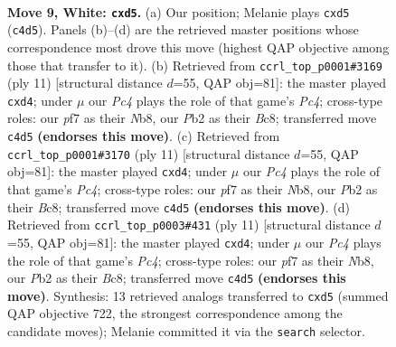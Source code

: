 \documentclass[11pt]{article}
\begin{document}
\clearpage

\begin{figure}[p]\centering
\begin{subfigure}{0.46\textwidth}\centering
\resizebox{\linewidth}{!}{%
\newchessgame
\chessboard[
  setfen={r1b1k2r/ppp1qpp1/2n1pn2/3p3p/2PP4/2B2NP1/PP2PPBP/R2QK2R w KQkq - 0 9},
  showmover=false,
  pgfstyle=straightmove, color=movearrow, markmove={c4-d5}
]}
\caption{}
\end{subfigure}\hfill
\begin{subfigure}{0.46\textwidth}\centering
\resizebox{\linewidth}{!}{%
\newchessgame
\chessboard[
  setfen={rnbqk2r/pp2ppbp/5np1/2pp4/2PP4/2N2NP1/PP2PPBP/R1BQK2R b KQkq - 1 6},
  showmover=false,
  pgfstyle=straightmove, color=movearrow, markmove={c5-d4}
]}
\caption{}
\end{subfigure}
\\[4pt]
\begin{subfigure}{0.46\textwidth}\centering
\resizebox{\linewidth}{!}{%
\newchessgame
\chessboard[
  setfen={rnbqk2r/pp2ppbp/5np1/2pp4/2PP4/2N2NP1/PP2PPBP/R1BQK2R b KQkq - 1 6},
  showmover=false,
  pgfstyle=straightmove, color=movearrow, markmove={c5-d4}
]}
\caption{}
\end{subfigure}\hfill
\begin{subfigure}{0.46\textwidth}\centering
\resizebox{\linewidth}{!}{%
\newchessgame
\chessboard[
  setfen={rnbqk2r/pp2ppbp/5np1/2pp4/2PP4/2N2NP1/PP2PPBP/R1BQK2R b KQkq - 1 6},
  showmover=false,
  pgfstyle=straightmove, color=movearrow, markmove={c5-d4}
]}
\caption{}
\end{subfigure}
\caption{\textbf{Move 9, White: \texttt{cxd5}.} (a) Our position; Melanie plays \texttt{cxd5} (\texttt{c4d5}). Panels (b)--(d) are the retrieved master positions whose correspondence most drove this move (highest QAP objective among those that transfer to it). (b) Retrieved from \texttt{ccrl\_top\_p0001\#3169} (ply 11) [structural distance $d$=55, QAP obj=81]: the master played \texttt{cxd4}; under $\mu$ our \emph{Pc4} plays the role of that game's \emph{Pc4}; cross-type roles: our \emph{p}f7 as their \emph{N}b8, our \emph{P}b2 as their \emph{B}c8; transferred move \texttt{c4d5} \textbf{(endorses this move)}. (c) Retrieved from \texttt{ccrl\_top\_p0001\#3170} (ply 11) [structural distance $d$=55, QAP obj=81]: the master played \texttt{cxd4}; under $\mu$ our \emph{Pc4} plays the role of that game's \emph{Pc4}; cross-type roles: our \emph{p}f7 as their \emph{N}b8, our \emph{P}b2 as their \emph{B}c8; transferred move \texttt{c4d5} \textbf{(endorses this move)}. (d) Retrieved from \texttt{ccrl\_top\_p0003\#431} (ply 11) [structural distance $d$=55, QAP obj=81]: the master played \texttt{cxd4}; under $\mu$ our \emph{Pc4} plays the role of that game's \emph{Pc4}; cross-type roles: our \emph{p}f7 as their \emph{N}b8, our \emph{P}b2 as their \emph{B}c8; transferred move \texttt{c4d5} \textbf{(endorses this move)}. Synthesis: 13 retrieved analogs transferred to \texttt{cxd5} (summed QAP objective 722, the strongest correspondence among the candidate moves); Melanie committed it via the \texttt{search} selector.}
\label{fig:thought-m16}
\end{figure}
\end{document}
